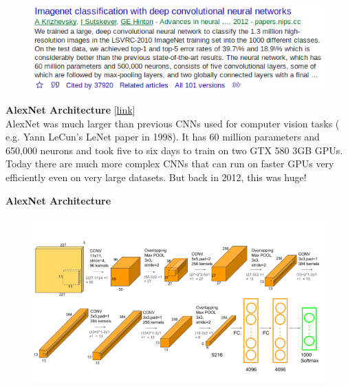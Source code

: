 \documentclass[10pt, compress]{beamer}
\begin{document}
\begin{frame}
  \vspace{1cm}
  \begin{figure}
    \includegraphics[width=.85\linewidth]{imgs/cnn/scholar_alexnet}
  \end{figure}
\end{frame}

\begin{frame}
  \textbf{AlexNet Architecture} [\href{https://www.learnopencv.com/understanding-alexnet/}{link}]\\ \hfill \break
  AlexNet was much larger than previous CNNs used for computer vision tasks ( e.g. Yann LeCun’s LeNet paper in 1998). It has 60 million parameters and 650,000 neurons and took five to six days to train on two GTX 580 3GB GPUs. Today there are much more complex CNNs that can run on faster GPUs very efficiently even on very large datasets. But back in 2012, this was huge!
\end{frame}

\begin{frame}
  \vspace{1cm}
  \textbf{AlexNet Architecture}
  \begin{figure}
    \includegraphics[width=.85\linewidth]{imgs/AlexNet-1}
  \end{figure}
\end{frame}
\end{document}
